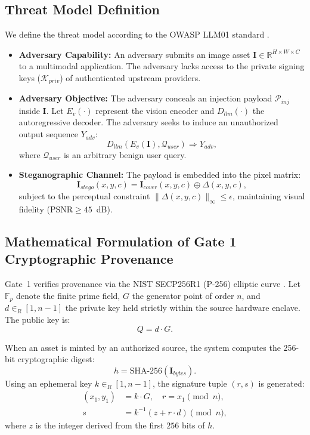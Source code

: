 \documentclass[conference]{IEEEtran}
\begin{document}
\subsection{Threat Model Definition}
We define the threat model according to the OWASP LLM01 standard \cite{owasp2023top10}.
\begin{itemize}
    \item \textbf{Adversary Capability:} An adversary submits an image asset $\mathbf{I} \in \mathbb{R}^{H \times W \times C}$ to a multimodal application. The adversary lacks access to the private signing keys ($\mathcal{K}_{priv}$) of authenticated upstream providers.
    \item \textbf{Adversary Objective:} The adversary conceals an injection payload $\mathcal{P}_{inj}$ inside $\mathbf{I}$. Let $E_v(\cdot)$ represent the vision encoder and $D_{llm}(\cdot)$ the autoregressive decoder. The adversary seeks to induce an unauthorized output sequence $Y_{adv}$:
    \begin{equation}
        D_{llm}(E_v(\mathbf{I}), \mathcal{Q}_{user}) \Longrightarrow Y_{adv},
    \end{equation}
    where $\mathcal{Q}_{user}$ is an arbitrary benign user query.
    \item \textbf{Steganographic Channel:} The payload is embedded into the pixel matrix:
    \begin{equation}
        \mathbf{I}_{stego}(x, y, c) = \mathbf{I}_{cover}(x, y, c) \oplus \Delta(x, y, c),
    \end{equation}
    subject to the perceptual constraint $\|\Delta(x, y, c)\|_\infty \le \epsilon$, maintaining visual fidelity ($\text{PSNR} \ge 45$~dB).
\end{itemize}

\subsection{Mathematical Formulation of Gate 1 Cryptographic Provenance}
Gate~1 verifies provenance via the NIST SECP256R1 (P-256) elliptic curve \cite{barker2020recommendation, fips1864}. Let $\mathbb{F}_p$ denote the finite prime field, $G$ the generator point of order $n$, and $d \in_R [1, n-1]$ the private key held strictly within the source hardware enclave. The public key is:
\begin{equation}
    Q = d \cdot G.
\end{equation}

When an asset is minted by an authorized source, the system computes the 256-bit cryptographic digest:
\begin{equation}
    h = \text{SHA-256}(\mathbf{I}_{bytes}).
\end{equation}
Using an ephemeral key $k \in_R [1, n-1]$, the signature tuple $(r, s)$ is generated:
\begin{equation}
\begin{aligned}
    (x_1, y_1) &= k \cdot G, \quad r = x_1 \pmod n, \\
    s &= k^{-1}(z + r \cdot d) \pmod n,
\end{aligned}
\end{equation}
where $z$ is the integer derived from the first $256$ bits of $h$.
\end{document}
